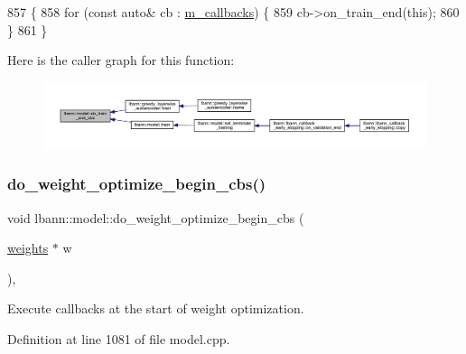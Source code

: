\begin{DoxyCode}
857                              \{
858   \textcolor{keywordflow}{for} (\textcolor{keyword}{const} \textcolor{keyword}{auto}& cb : \hyperlink{classlbann_1_1model_a07b511fef30368494c2ad80922ffd0eb}{m\_callbacks}) \{
859     cb->on\_train\_end(\textcolor{keyword}{this});
860   \}
861 \}
\end{DoxyCode}
Here is the caller graph for this function\+:\nopagebreak
\begin{figure}[H]
\begin{center}
\leavevmode
\includegraphics[width=350pt]{classlbann_1_1model_a13bb6edae42c719b78454a8af9549122_icgraph}
\end{center}
\end{figure}
\mbox{\label{classlbann_1_1model_a24b668fa62ce0215d3b1773636b7eced}} 
\subsubsection{\texorpdfstring{do\+\_\+weight\+\_\+optimize\+\_\+begin\+\_\+cbs()}{do\_weight\_optimize\_begin\_cbs()}}
{\footnotesize\ttfamily void lbann\+::model\+::do\+\_\+weight\+\_\+optimize\+\_\+begin\+\_\+cbs (\begin{DoxyParamCaption}\item[{\hyperlink{classlbann_1_1weights}{weights} $\ast$}]{w }\end{DoxyParamCaption})\hspace{0.3cm}{\ttfamily [protected]}, {\ttfamily [virtual]}}

Execute callbacks at the start of weight optimization. 

Definition at line 1081 of file model.\+cpp.


